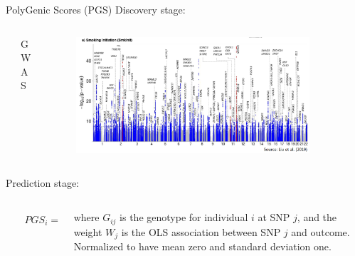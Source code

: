 \documentclass[10pt,compress,xcolor=dvipsnames,aspectratio=169]{beamer}    %
\newcounter{ex}
\newcommand{\1}[1]{\mathrm{1\hspace*{-2.5pt}l}[#1]}	%
\begin{document}
\begin{frame}{PolyGenic Scores (PGS)}
Discovery stage:
		\vspace{-0.7cm}
\begin{columns}[T]
	\begin{column}{0\textwidth}
	\end{column}%
	\hfill%
	\begin{column}{.2\textwidth}
		\vspace{2cm}
		GWAS {\color{Verde}\cite{GSCAN2019gwas}}
	\end{column}%
	\hfill%
	\begin{column}{.8\textwidth}
		\begin{figure}
		\centering
		\includegraphics[width=0.9\textwidth]{./include/smokeInit_manhattan.png}
		\label{fig:manhattan}
		\end{figure}
	\end{column}%
\end{columns}

Prediction stage:
\begin{columns}[T] %
	\begin{column}{.03\textwidth}
	\end{column}%
	\hfill%
	\begin{column}{.2\textwidth}
		\vspace{-0.45cm}
		{\color{Verde}\begin{align*}
			PGS_i = \sum_{j=1}^{J} W_j G_{ij},
		\end{align*}}
	\end{column}%
	\hfill%
	\begin{column}{.77\textwidth}
		\begin{footnotesize}
where $G_{ij}$ is the genotype for individual $i$ at SNP $j$, and the weight $W_j$ is the OLS association between SNP $j$ and outcome. Normalized to have mean zero and standard deviation one.
		\end{footnotesize}
	\end{column}%
\end{columns}

\end{frame}
\end{document}
